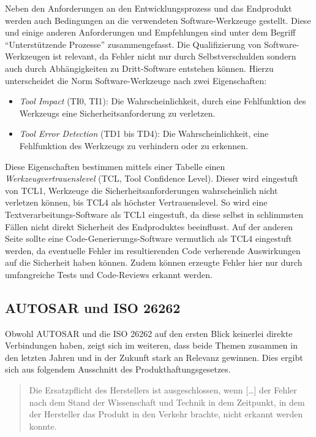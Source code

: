 \documentclass[
  a4paper,					    %
  twoside,
  DIV=calc,     				%
  bibliography=totoc,
  cleardoublepage=empty,
  ngerman,     					%
  final       					%
]{scrbook}
\begin{document}
Neben den Anforderungen an den Entwicklungsprozess und das Endprodukt werden auch Bedingungen an die verwendeten Software-Werkzeuge gestellt. Diese und einige anderen Anforderungen und Empfehlungen sind unter dem Begriff "`Unterstützende Prozesse"' zusammengefasst. Die Qualifizierung von Software-Werkzeugen ist relevant, da Fehler nicht nur durch Selbstverschulden sondern auch durch Abhängigkeiten zu Dritt-Software entstehen können. Hierzu unterscheidet die Norm Software-Werkzeuge nach zwei Eigenschaften:

\begin{itemize}
    \item \emph{Tool Impact} (TI0, TI1): Die Wahrscheinlichkeit, durch eine Fehlfunktion des Werkzeugs eine Sicherheitsanforderung zu verletzen.
    \item \emph{Tool Error Detection} (TD1 bis TD4): Die Wahrscheinlichkeit, eine Fehlfunktion des Werkzeugs zu verhindern oder zu erkennen.
\end{itemize}

Diese Eigenschaften bestimmen mittels einer Tabelle einen \emph{Werkzeugvertrauenslevel} (TCL, Tool Confidence Level). Dieser wird eingestuft von TCL1, Werkzeuge die Sicherheitsanforderungen wahrscheinlich nicht verletzen können, bis TCL4 als höchster Vertrauenslevel. So wird eine Textverarbeitungs-Software als TCL1 eingestuft, da diese selbst in schlimmsten Fällen nicht direkt Sicherheit des Endproduktes beeinflusst. Auf der anderen Seite sollte eine Code-Generierungs-Software vermutlich als TCL4 eingestuft werden, da eventuelle Fehler im resultierenden Code verherende Auswirkungen auf die Sicherheit haben können. Zudem können erzeugte Fehler hier nur durch umfangreiche Tests und Code-Reviews erkannt werden.




\subsection{AUTOSAR und ISO 26262}
\label{sec:ISO26262_autosar}
Obwohl AUTOSAR und die ISO 26262 auf den ersten Blick keinerlei direkte Verbindungen haben, zeigt sich im weiteren, dass beide Themen zusammen in den letzten Jahren und in der Zukunft stark an Relevanz gewinnen. Dies ergibt sich aus folgendem Ausschnitt des Produkthaftungsgesetzes.

\begin{quote}
Die Ersatzpflicht des Herstellers ist ausgeschlossen, wenn [\dots] der Fehler nach dem Stand der Wissenschaft und Technik in dem Zeitpunkt, in dem der Hersteller das Produkt in den Verkehr brachte, nicht erkannt werden konnte.\cite{ProdG}
\end{quote}
\end{document}
